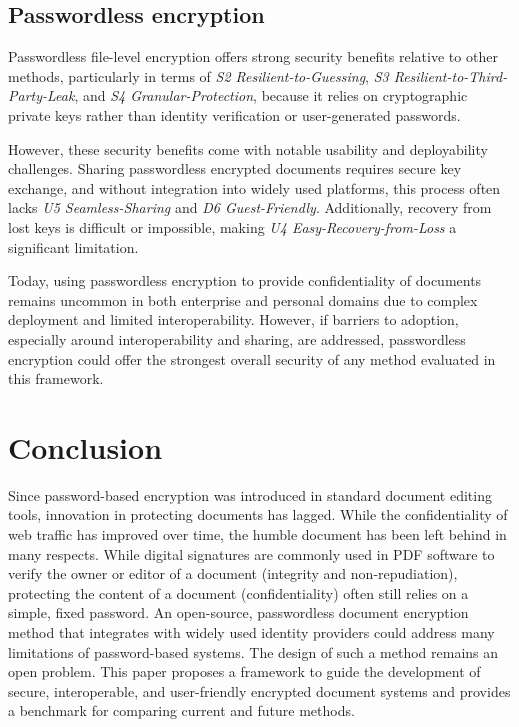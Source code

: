 \documentclass[sigconf]{acmart}
\begin{document}
\subsection{Passwordless encryption}

Passwordless file-level encryption offers strong security benefits relative to other methods, particularly in terms of \textit{S2 Resilient-to-Guessing}, \textit{S3 Resilient-to-Third-Party-Leak}, and \textit{S4 Granular-Protection}, because it relies on cryptographic private keys rather than identity verification or user-generated passwords.

However, these security benefits come with notable usability and deployability challenges. Sharing passwordless encrypted documents requires secure key exchange, and without integration into widely used platforms, this process often lacks \textit{U5 Seamless-Sharing} and \textit{D6 Guest-Friendly}. Additionally, recovery from lost keys is difficult or impossible, making \textit{U4 Easy-Recovery-from-Loss} a significant limitation.

Today, using passwordless encryption to provide confidentiality of documents remains uncommon in both enterprise and personal domains due to complex deployment and limited interoperability. However, if barriers to adoption, especially around interoperability and sharing, are addressed, passwordless encryption could offer the strongest overall security of any method evaluated in this framework.

\section{Conclusion}
Since password-based encryption was introduced in standard document editing tools, innovation in protecting documents has lagged. While the confidentiality of web traffic has improved over time, the humble document has been left behind in many respects. While digital signatures are commonly used in PDF software to verify the owner or editor of a document (integrity and non-repudiation), protecting the content of a document (confidentiality) often still relies on a simple, fixed password. An open-source, passwordless document encryption method that integrates with widely used identity providers could address many limitations of password-based systems. The design of such a method remains an open problem. This paper proposes a framework to guide the development of secure, interoperable, and user-friendly encrypted document systems and provides a benchmark for comparing current and future methods.

  
  
\end{document}

